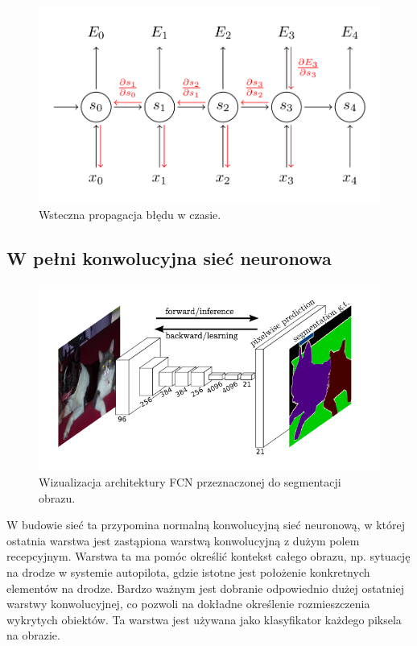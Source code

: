 \documentclass[12pt,a4paper,twoside,titlepage,openright]{book}
\begin{document}
\begin{itemize}
\begin{figure}[ht]
	\centering
			\includegraphics[resolution=100, scale=0.55]{backpropagationThroughTime.png}
		\caption{Wsteczna propagacja błędu w czasie.}
\end{figure}

\subsection{W pełni konwolucyjna sieć neuronowa}

\begin{figure}[ht]
	\centering
			\includegraphics[resolution=100, scale=0.8]{fullyConvolutionalNetwork.png}
		\caption{Wizualizacja architektury FCN przeznaczonej do segmentacji obrazu.}
\end{figure}
W budowie sieć ta przypomina normalną konwolucyjną sieć neuronową, w której ostatnia warstwa jest zastąpiona warstwą konwolucyjną z dużym polem recepcyjnym. Warstwa ta ma pomóc określić kontekst całego obrazu, np. sytuację na drodze w systemie autopilota, gdzie istotne jest położenie konkretnych elementów na drodze. Bardzo ważnym jest dobranie odpowiednio dużej ostatniej warstwy konwolucyjnej, co pozwoli na dokładne określenie rozmieszczenia wykrytych obiektów. Ta warstwa jest używana jako klasyfikator każdego piksela na obrazie.


\end{itemize}
\end{document}
